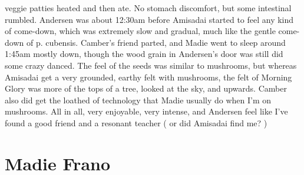 \documentclass[12pt]{book}
\begin{document}
veggie patties heated and then ate. No stomach discomfort, but some intestinal rumbled. Andersen was about 12:30am before Amisadai started to feel any kind of come-down, which was extremely slow and gradual, much like the gentle come-down of p. cubensis. Camber's friend parted, and Madie went to sleep around 1:45am mostly down, though the wood grain in Andersen's door was still did some crazy danced. The feel of the seeds was similar to mushrooms, but whereas Amisadai get a very grounded, earthy felt with mushrooms, the felt of Morning Glory was more of the tops of a tree, looked at the sky, and upwards. Camber also did get the loathed of technology that Madie usually do when I'm on mushrooms. All in all, very enjoyable, very intense, and Andersen feel like I've found a good friend and a resonant teacher ( or did Amisadai find me? )



\chapter{Madie Frano}
\end{document}
